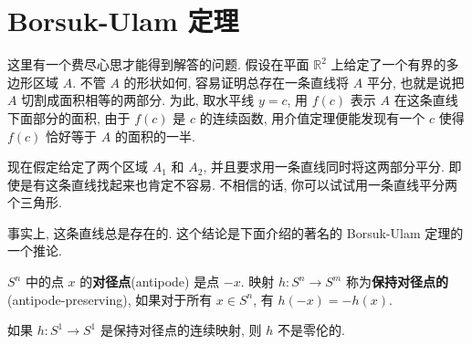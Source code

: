 \section{Borsuk-Ulam 定理}
\label{section:ch09-sec57}

这里有一个费尽心思才能得到解答的问题. 假设在平面 $\mathbb{R}^{2}$ 上给定了一个有界的多边形区域 $A$. 不管 $A$ 的形状如何, 容易证明总存在一条直线将 $A$ 平分, 也就是说把 $A$ 切割成面积相等的两部分. 为此, 取水平线 $y=c$, 用 $f(c)$ 表示 $A$ 在这条直线下面部分的面积, 由于 $f(c)$ 是 $c$ 的连续函数, 用介值定理便能发现有一个 $c$ 使得 $f(c)$ 恰好等于 $A$ 的面积的一半.

现在假定给定了两个区域 $A_1$ 和 $A_2$, 并且要求用一条直线同时将这两部分平分. 即使是有这条直线找起来也肯定不容易. 不相信的话, 你可以试试用一条直线平分两个三角形.

事实上, 这条直线总是存在的. 这个结论是下面介绍的著名的 Borsuk-Ulam 定理的一个推论.

\begin{definition}[对径点与保持对径点的映射]
\label{definition:ch09-sec57-antipode}
$S^{n}$ 中的点 $x$ 的\textbf{对径点}(antipode) 是点 $-x$. 映射 $h\colon S^{n}\to S^{m}$ 称为\textbf{保持对径点的}(antipode-preserving), 如果对于所有 $x\in S^{n}$, 有 $h(-x)=-h(x)$.
\end{definition}

\begin{theorem}
\label{theorem:ch09-sec57-57-1}
如果 $h\colon S^{1}\to S^{1}$ 是保持对径点的连续映射, 则 $h$ 不是零伦的.
\end{theorem}

